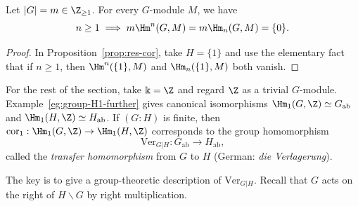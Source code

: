 \begin{corollary}\label{prop:group-coh-torsion}
	Let $|G|=m\in\Z_{\geq1}$. For every $G$-module $M$, we have
	\[ n \geq 1 \implies m \Hm^n(G, M) = m \Hm_n(G, M) = \{0\}. \]
\end{corollary}
\begin{proof}
	In Proposition~\ref{prop:res-cor}, take $H=\{1\}$ and use the elementary
	fact that if $n\geq1$, then $\Hm^n(\{1\},M)$ and $\Hm_n(\{1\},M)$ both
	vanish.
\end{proof}

For the rest of the section, take $\Bbbk=\Z$ and regard $\Z$ as a trivial
$G$-module. Example~\ref{eg:group-H1-further} gives canonical isomorphisms
$\Hm_1(G,\Z)\simeq G_{\mathrm{ab}}$ and
$\Hm_1(H,\Z)\simeq H_{\mathrm{ab}}$. If $(G:H)$ is finite, then
$\mathrm{cor}_1:\Hm_1(G,\Z)\to\Hm_1(H,\Z)$ corresponds to the group
homomorphism
\begin{equation*}
	\mathrm{Ver}_{G|H}: G_{\mathrm{ab}} \to H_{\mathrm{ab}},
\end{equation*}
called the \emph{transfer homomorphism} from $G$ to $H$ (German:
\textit{die Verlagerung}).

The key is to give a group-theoretic description of
$\mathrm{Ver}_{G|H}$. Recall that $G$ acts on the right of
$H\backslash G$ by right multiplication.

